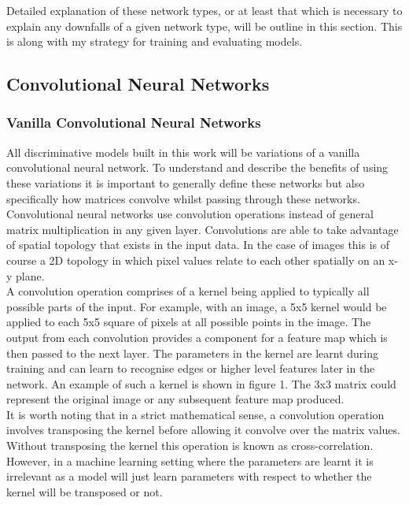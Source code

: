 \documentclass{article}
\begin{document}
Detailed explanation of these network types, or at least that which is necessary to explain any downfalls of a given network type, will be outline in this section. This is along with my strategy for training and evaluating models. \\ 

\subsection{Convolutional Neural Networks}

\subsubsection{Vanilla Convolutional Neural Networks}
All discriminative models built in this work will be variations of a vanilla convolutional neural network. To understand and describe the benefits of using these variations it is important to generally define these networks but also specifically how matrices convolve whilst passing through these networks.\\

Convolutional neural networks use convolution operations instead of general matrix multiplication in any given layer. Convolutions are able to take advantage of spatial topology that exists in the input data. In the case of images this is of course a 2D topology in which pixel values relate to each other spatially on an x-y plane.\\

A convolution operation comprises of a kernel being applied to  typically all possible parts of the input. For example, with an image, a 5x5 kernel would be applied to each 5x5 square of pixels at all possible points in the image. The output from each convolution provides a component for a feature map which is then passed to the next layer. The parameters in the kernel are learnt during training and can learn to recognise edges or higher level features later in the network. An example of such a kernel is shown in figure 1. The 3x3 matrix could represent the original image or any subsequent feature map produced.\\

It is worth noting that in a strict mathematical sense, a convolution operation involves transposing the kernel before allowing it convolve over the matrix values. Without transposing the kernel this operation is known as cross-correlation. However, in a machine learning setting where the parameters are learnt it is irrelevant as a model will just learn parameters with respect to whether the kernel will be transposed or not. \\
\end{document}
